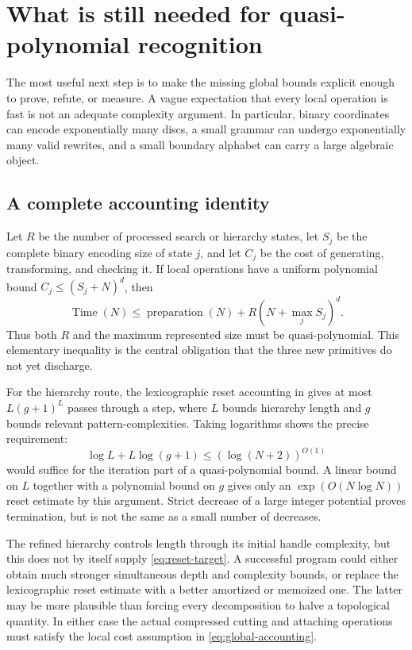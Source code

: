 \section{What is still needed for quasi-polynomial recognition}
\label{sec:research}

The most useful next step is to make the missing global bounds explicit
enough to prove, refute, or measure. A vague expectation that every local
operation is fast is not an adequate complexity argument. In particular,
binary coordinates can encode exponentially many discs, a small grammar can
undergo exponentially many valid rewrites, and a small boundary alphabet
can carry a large algebraic object.

\subsection{A complete accounting identity}

Let $R$ be the number of processed search or hierarchy states, let $S_j$
be the complete binary encoding size of state $j$, and let $C_j$ be the
cost of generating, transforming, and checking it. If local operations have
a uniform polynomial bound $C_j\leq(S_j+N)^d$, then
\begin{equation}
 \operatorname{Time}(N)
 \leq\operatorname{preparation}(N)+
 R\left(N+\max_j S_j\right)^d.
 \label{eq:global-accounting}
\end{equation}
Thus both $R$ and the maximum represented size must be quasi-polynomial.
This elementary inequality is the central obligation that the three new
primitives do not yet discharge.

For the hierarchy route, the lexicographic reset accounting in
\cite[Section~9]{lackenby2026} gives at most $L(g+1)^L$ passes through a
step, where $L$ bounds hierarchy length and $g$ bounds relevant
pattern-complexities. Taking logarithms shows the precise requirement:
\begin{equation}
 \log L+L\log(g+1)\leq(\log(N+2))^{O(1)}
 \label{eq:reset-target}
\end{equation}
would suffice for the iteration part of a quasi-polynomial bound. A linear
bound on $L$ together with a polynomial bound on $g$ gives only an
$\exp(O(N\log N))$ reset estimate by this argument. Strict decrease of a
large integer potential proves termination, but is not the same as a small
number of decreases.

The refined hierarchy controls length through its initial handle complexity,
but this does not by itself supply \eqref{eq:reset-target}. A successful
program could either obtain much stronger simultaneous depth and complexity
bounds, or replace the lexicographic reset estimate with a better amortized
or memoized one. The latter may be more plausible than forcing every
decomposition to halve a topological quantity. In either case the actual
compressed cutting and attaching operations must satisfy the local cost
assumption in \eqref{eq:global-accounting}.

